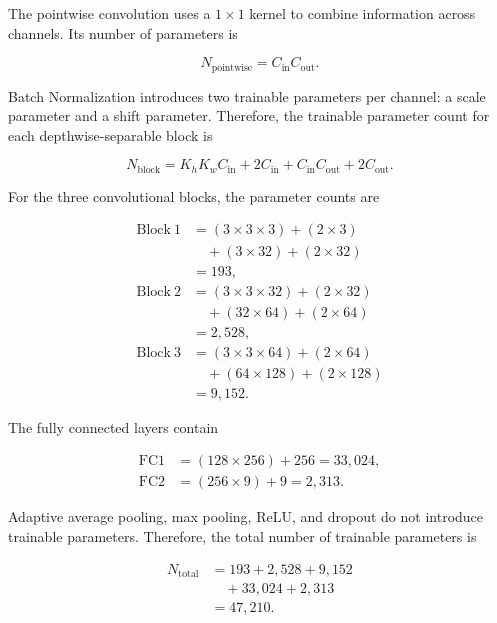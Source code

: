 \documentclass[12pt,a4paper]{article}
\begin{document}
The pointwise convolution uses a $1\times1$ kernel to combine information
across channels. Its number of parameters is

\begin{equation}
N_{\mathrm{pointwise}} =
C_{\mathrm{in}}C_{\mathrm{out}}.
\end{equation}

Batch Normalization introduces two trainable parameters per channel:
a scale parameter and a shift parameter. Therefore, the trainable
parameter count for each depthwise-separable block is

\begin{equation}
N_{\mathrm{block}} =
K_hK_wC_{\mathrm{in}} + 2C_{\mathrm{in}}
+ C_{\mathrm{in}}C_{\mathrm{out}} + 2C_{\mathrm{out}}.
\end{equation}

For the three convolutional blocks, the parameter counts are

\begin{align*}
\mathrm{Block\ 1}
&= (3\times3\times3)+(2\times3)\\
&\quad +(3\times32)+(2\times32)\\
&=193,\\[4pt]
\mathrm{Block\ 2}
&= (3\times3\times32)+(2\times32)\\
&\quad +(32\times64)+(2\times64)\\
&=2,528,\\[4pt]
\mathrm{Block\ 3}
&= (3\times3\times64)+(2\times64)\\
&\quad +(64\times128)+(2\times128)\\
&=9,152.
\end{align*}

The fully connected layers contain

\begin{align*}
\mathrm{FC1} &= (128\times256)+256 = 33,024,\\
\mathrm{FC2} &= (256\times9)+9 = 2,313.
\end{align*}

Adaptive average pooling, max pooling, ReLU, and dropout do not
introduce trainable parameters. Therefore, the total number of
trainable parameters is

\begin{align*}
N_{\mathrm{total}}
&=193+2,528+9,152\\
&\quad +33,024+2,313\\
&=\boxed{47,210}.
\end{align*}
\end{document}
